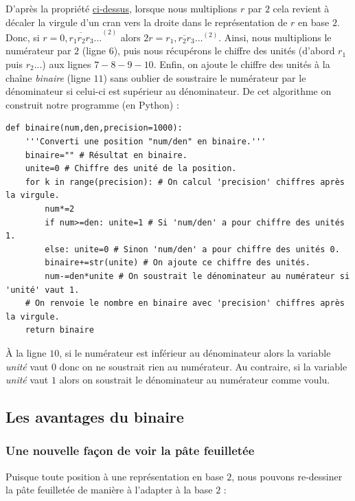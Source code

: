 \documentclass[a4paper,french,12pt]{article}
\begin{document}
D'après la propriété \hyperlink{5}{ci-dessus}, lorsque nous multiplions $r$ par $2$ cela revient à décaler la virgule d'un cran vers la droite dans le représentation de $r$ en base $2$. Donc, si $r=\overline{0,r_1r_2r_3\ldots}^{\left(2\right)}$ alors $2r=\overline{r_1,r_2r_3\ldots}^{\left(2\right)}$. Ainsi, nous multiplions le numérateur par $2$ (ligne $6$), puis nous récupérons le chiffre des unités (d'abord $r_1$ puis $r_2$...) aux lignes $7-8-9-10$. Enfin, on ajoute le chiffre des unités à la chaîne \emph{binaire} (ligne $11$) sans oublier de soustraire le numérateur par le dénominateur si celui-ci est supérieur au dénominateur. De cet algorithme on construit notre programme (en Python) :

\begin{center}
\begin{verbatim}
def binaire(num,den,precision=1000):
    '''Converti une position "num/den" en binaire.'''
    binaire="" # Résultat en binaire.
    unite=0 # Chiffre des unité de la position.
    for k in range(precision): # On calcul 'precision' chiffres après la virgule.
        num*=2
        if num>=den: unite=1 # Si 'num/den' a pour chiffre des unités 1.
        else: unite=0 # Sinon 'num/den' a pour chiffre des unités 0.
        binaire+=str(unite) # On ajoute ce chiffre des unités.
        num-=den*unite # On soustrait le dénominateur au numérateur si 'unité' vaut 1.
    # On renvoie le nombre en binaire avec 'precision' chiffres après la virgule.
    return binaire
\end{verbatim}
\end{center}

À la ligne $10$, si le numérateur est inférieur au dénominateur alors la variable \emph{unité} vaut $0$ donc on ne soustrait rien au numérateur. Au contraire, si la variable \emph{unité} vaut $1$ alors on soustrait le dénominateur au numérateur comme voulu.

\subsection{Les avantages du binaire}
\subsubsection{Une nouvelle façon de voir la pâte feuilletée}
Puisque toute position à une représentation en base $2$, nous pouvons re-dessiner la pâte feuilletée de manière à l'adapter à la base $2$ :
\end{document}
